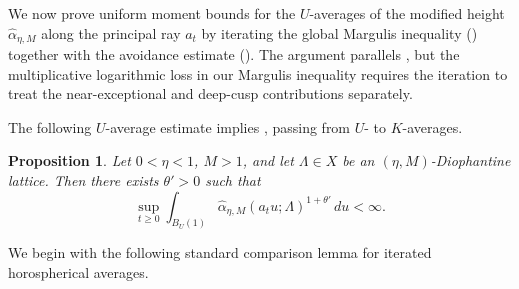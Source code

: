 \documentclass[reqno,11pt]{amsart}
\numberwithin{equation}{section}
\newtheorem{proposition}[theorem]{Proposition}
\theoremstyle{definition}
\theoremstyle{remark}
\begin{document}
We now prove uniform moment bounds for the $U$-averages of the modified
height $\widehat{\alpha}_{\eta,M}$ along the principal ray $a_t$ by
iterating the global Margulis inequality
() together with the avoidance estimate
(). The argument parallels \cite{Kim}, but the
multiplicative logarithmic loss in our Margulis inequality requires the
iteration to treat the near-exceptional and deep-cusp contributions
separately.



The following $U$-average estimate implies
, passing from $U$- to $K$-averages.


\begin{proposition}\label{prop:maintheoremforu}
Let $0<\eta<1$, $M>1$, and let $\Lambda\in X$ be an
$(\eta,M)$-Diophantine lattice. Then there
exists $\theta'>0$ such that
\begin{equation}\label{supa}
\sup_{t\ge0}
\int_{B_{U}(1)} \widehat{\alpha}_{\eta,M}(a_tu;\Lambda)^{1+\theta'}\,du
<\infty.
\end{equation}
\end{proposition}

We begin with the following standard comparison lemma for iterated
horospherical averages.
\end{document}
